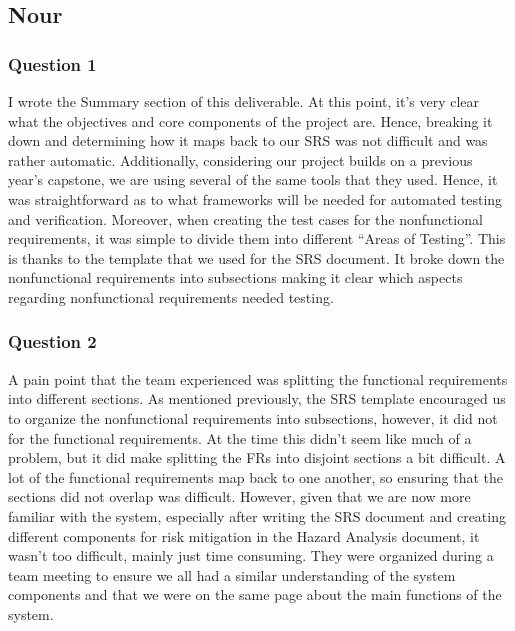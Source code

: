\documentclass[12pt, titlepage]{article}
\renewcommand{\_}{\oldunderscore\allowbreak}
\begin{document}
\subsection*{Nour}
\subsubsection*{Question 1}
I wrote the Summary section of this deliverable. At this point, it’s very clear what the objectives and core components of the project are. 
Hence, breaking it down and determining how it maps back to our SRS was not difficult and was rather automatic. 
Additionally, considering our project builds on a previous year’s capstone, we are using several of the same tools that they used. 
Hence, it was straightforward as to what frameworks will be needed for automated testing and verification. 
Moreover, when creating the test cases for the nonfunctional requirements, it was simple to divide them into different “Areas of Testing”. 
This is thanks to the template that we used for the SRS document. 
It broke down the nonfunctional requirements into subsections making it clear which aspects regarding nonfunctional requirements needed testing.

\subsubsection*{Question 2}
A pain point that the team experienced was splitting the functional requirements into different sections. 
As mentioned previously, the SRS template encouraged us to organize the nonfunctional requirements into subsections, however, it did not for the functional requirements. 
At the time this didn’t seem like much of a problem, but it did make splitting the FRs into disjoint sections a bit difficult. 
A lot of the functional requirements map back to one another, so ensuring that the sections did not overlap was difficult. 
However, given that we are now more familiar with the system, especially after writing the SRS document and creating different components for risk mitigation in the Hazard Analysis document, it wasn’t too difficult, mainly just time consuming. 
They were organized during a team meeting to ensure we all had a similar understanding of the system components and that we were on the same page about the main functions of the system.
\end{document}
